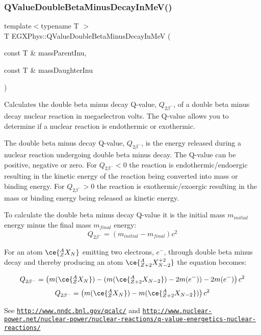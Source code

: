 \subsubsection{\texorpdfstring{Q\+Value\+Double\+Beta\+Minus\+Decay\+In\+Me\+V()}{QValueDoubleBetaMinusDecayInMeV()}}
{\footnotesize\ttfamily template$<$typename T $>$ \\
T E\+G\+X\+Phys\+::\+Q\+Value\+Double\+Beta\+Minus\+Decay\+In\+MeV (\begin{DoxyParamCaption}\item[{const T \&}]{mass\+Parent\+Inu,  }\item[{const T \&}]{mass\+Daughter\+Inu }\end{DoxyParamCaption})}



Calculates the double beta minus decay Q-\/value, $Q_{2\beta^-}$, of a double beta minus decay nuclear reaction in megaelectron volts. The Q-\/value allows you to determine if a nuclear reaction is endothermic or exothermic. 

The double beta minus decay Q-\/value, $Q_{2\beta^-}$, is the energy released during a nuclear reaction undergoing double beta minus decay. The Q-\/value can be positive, negative or zero. For $Q_{2\beta^-} < 0$ the reaction is endothermic/endoergic resulting in the kinetic energy of the reaction being converted into mass or binding energy. For $Q_{2\beta^-} > 0$ the reaction is exothermic/exoergic resulting in the mass or binding energy being released as kinetic energy.

To calculate the double beta minus decay Q-\/value it is the initial mass $m_{initial}$ energy minus the final mass $m_{final}$ energy\+: \[Q_{2\beta^-} = \left ( m_{initial}-m_{final}\right ) c^2\]

For an atom $\ce{ ^{A}_{Z}X_{N} }$ emitting two electrons, $e^-$, through double beta minus decay and thereby producing an atom $\ce{ ^{A}_{Z{+2}}X^{+2}_{N-2} }$ the equation becomes\+:

\[Q_{2\beta^-} = \left ( m(\ce{ ^{A}_{Z}X_{N} }) - (m(\ce{ ^{A}_{Z{+2}}X_{N-2} }) - 2m(e^-)) - 2m(e^-)\right ) c^2\] \[Q_{2\beta^-} = \left ( m(\ce{ ^{A}_{Z}X_{N} }) - m(\ce{ ^{A}_{Z{+2}}X_{N-2} })\right ) c^2\]

See \href{http://www.nndc.bnl.gov/qcalc/}{\tt http\+://www.\+nndc.\+bnl.\+gov/qcalc/} and \href{http://www.nuclear-power.net/nuclear-power/nuclear-reactions/q-value-energetics-nuclear-reactions/}{\tt http\+://www.\+nuclear-\/power.\+net/nuclear-\/power/nuclear-\/reactions/q-\/value-\/energetics-\/nuclear-\/reactions/}

